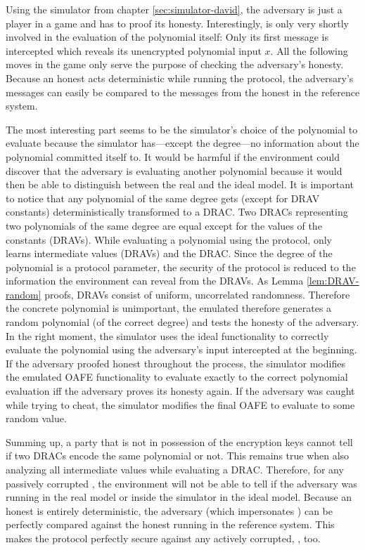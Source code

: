 Using the simulator from chapter \ref{sec:simulator-david}, the adversary
\JWadv{} is just a player in a game and has to proof its honesty. Interestingly,
\JWadv{} is only very shortly involved in the evaluation of the polynomial
itself: Only its first message is intercepted which reveals its unencrypted
polynomial input $x$. All the following moves in the game only serve the purpose
of checking the adversary's honesty. Because an honest \JWpTwo{} acts
deterministic while running the protocol, the adversary's messages can easily be
compared to the messages from the honest \JWpTwo{} in the reference system.

The most interesting part seems to be the simulator's choice of the polynomial
to evaluate because the simulator has---except the degree---no information about
the polynomial \JWpOne{} committed itself to. It would be harmful if the
environment could discover that the adversary is evaluating another polynomial
because it would then be able to distinguish between the real and the ideal
model. It is important to notice that any polynomial of the same degree gets
(except for DRAV constants) deterministically transformed to a DRAC. Two DRACs
representing two polynomials of the same degree are equal except for the values
of the constants (DRAVs).  While evaluating a polynomial using the protocol,
\JWpTwo{} only learns intermediate values (DRAVs) and the DRAC. Since the degree
of the polynomial is a protocol parameter, the security of the protocol is
reduced to the information the environment can reveal from the DRAVs. As Lemma
\ref{lem:DRAV-random} proofs, DRAVs consist of uniform, uncorrelated randomness.
Therefore the concrete polynomial is unimportant, the emulated \JWpOne{}
therefore generates a random polynomial (of the correct degree) and tests the
honesty of the adversary. In the right moment, the simulator uses the ideal
functionality \JWfuncSymOPE{} to correctly evaluate the polynomial using the
adversary's input intercepted at the beginning. If the adversary proofed honest
throughout the process, the simulator modifies the emulated OAFE functionality
to evaluate exactly to the correct polynomial evaluation iff the adversary
proves its honesty again. If the adversary was caught while trying to cheat, the
simulator modifies the final OAFE to evaluate to some random value.

Summing up, a party that is not in possession of the encryption keys cannot tell
if two DRACs encode the same polynomial or not. This remains true when also
analyzing all intermediate values while evaluating a DRAC. Therefore, for any
passively corrupted \JWadv{}, the environment will not be able to tell if the
adversary \JWadv{} was running in the real model or inside the simulator in the
ideal model. Because an honest \JWpTwo{} is entirely deterministic, the
adversary (which impersonates \JWpTwo{}) can be perfectly compared against the
honest \JWpTwo{} running in the reference system. This makes the protocol
perfectly secure against any actively corrupted, \JWpTwo{}, too.


